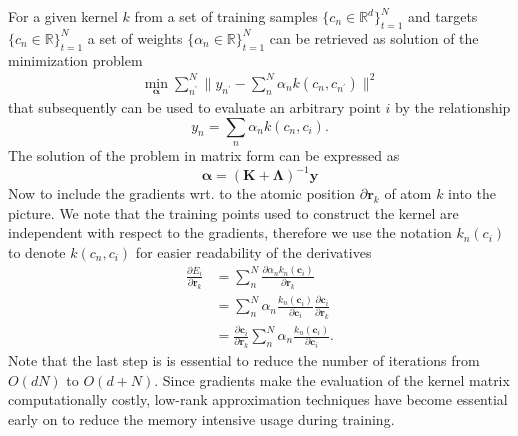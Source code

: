 For a given kernel $k$ from a set of training samples $\{c_n\in\mathbb{R}^d\}_{t=1}^N$ and targets $\{c_n\in\mathbb{R}\}_{t=1}^N$ a set of weights $\{\alpha_n\in\mathbb{R}\}_{t=1}^N$ can be retrieved as solution of the minimization problem
\begin{subequations}
\begin{align}
  \min_\mathbf{\alpha} \sum_{n^\prime}^N\| y_{n^\prime} - \sum_{n}^N \alpha_n k(c_n, c_{n^\prime}) \|^2
\end{align}
\end{subequations}
that subsequently can be used to evaluate an arbitrary point $i$ by the relationship
\begin{equation}
  y_n = \sum_n \alpha_n k(c_n, c_i).
\end{equation}
The solution of the problem in matrix form can be expressed as
\begin{equation}
  \mathbf{\alpha} = (\mathbf{K} + \mathbf{\Lambda})^{-1}\mathbf{y}
\end{equation}
Now to include the gradients wrt. to the atomic position $\partial\mathbf{r}_k$ of atom $k$ into the picture.
We note that the training points used to construct the kernel are independent with respect to the gradients, therefore we use the notation $k_n(c_i)$ to denote $k(c_n, c_i)$ for easier readability of the derivatives
\begin{subequations}
\begin{align}
  \frac{\partial E_i}{\partial\mathbf{r}_k} &= \sum_n^N \frac{\partial \alpha_n k_n(\mathbf{c}_i)}{\partial\mathbf{r}_k} \\
    &= \sum_n^N \alpha_n \frac{k_n(\mathbf{c}_i)}{\partial\mathbf{c}_i} \frac{\partial\mathbf{c}_i}{\partial\mathbf{r}_k} \\
    &= \frac{\partial\mathbf{c}_i}{\partial\mathbf{r}_k} \sum_n^N \alpha_n \frac{k_n(\mathbf{c}_i)}{\partial\mathbf{c}_i}.
\end{align}
\end{subequations}
Note that the last step is is essential to reduce the number of iterations from $O(dN)$ to $O(d+N)$.
Since gradients make the evaluation of the kernel matrix computationally costly, low-rank approximation techniques have become essential early on to reduce the memory intensive usage during training.
